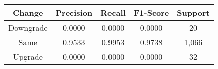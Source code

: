 \footnotesize
\begin{tabular}{ccccc}
\toprule
Change & Precision & Recall & F1-Score & Support \\
\midrule
Downgrade & 0.0000 & 0.0000 & 0.0000 & 20 \\
Same & 0.9533 & 0.9953 & 0.9738 & 1,066 \\
Upgrade & 0.0000 & 0.0000 & 0.0000 & 32 \\
\bottomrule
\end{tabular}

\normalsize